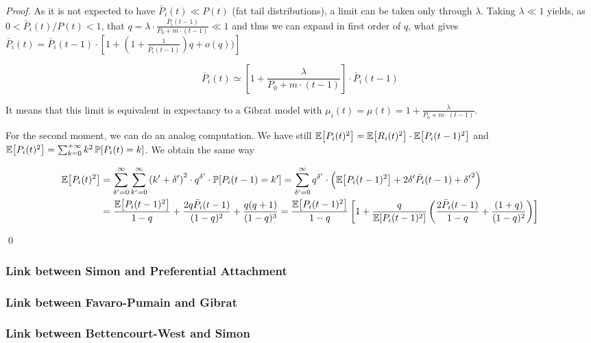 \begin{proof}
As it is not expected to have $\bar{P}_i(t)\ll P(t)$ (fat tail distributions), a limit can be taken only through $\lambda$. Taking $\lambda \ll 1$ yields, as $0 < \bar{P}_i(t)/P(t) < 1$, that $q=\lambda\cdot\frac{\bar{P}_i(t-1)}{P_0 + m\cdot (t-1)} \ll 1$ and thus we can expand in first order of $q$, what gives $\bar{P}_i(t)=\bar{P}_i(t-1)\cdot \left[1 + \left(1+\frac{1}{\bar{P}_i(t-1)}\right)q + o(q))\right]$

\[
\bar{P}_i(t) \simeq \left[1 + \frac{\lambda}{P_0 + m\cdot (t-1)}\right]\cdot \bar{P}_i(t-1)
\]

It means that this limit is equivalent in expectancy to a Gibrat model with $\mu_i(t) = \mu(t)=1 + \frac{\lambda}{P_0 + m\cdot (t-1)}$.

For the second moment, we can do an analog computation. We have still $\operatorname{\mathbb{E}}\!\left[P_i(t)^2\right] = \operatorname{\mathbb{E}}\!\left[R_i(t)^2\right]\cdot \operatorname{\mathbb{E}}\!\left[P_i(t-1)^2\right]$ and $\operatorname{\mathbb{E}}\!\left[P_i(t)^2\right]=\sum_{k=0}^{+\infty}{k^2 \operatorname{\mathbb{P}}\!\left[P_i(t)=k\right]}$. We obtain the same way 

\[
\begin{split}
\operatorname{\mathbb{E}}\!\left[P_i(t)^2\right] & = \sum_{\delta^{\prime}=0}^{\infty}{\sum_{k^{\prime}=0}^{\infty}{\left(k^\prime + \delta^{\prime}\right)^2\cdot q^{\delta^{\prime}} \cdot \operatorname{\mathbb{P}}\!\left[P_i(t-1)=k^\prime\right]}} = \sum_{\delta^{\prime}=0}^{\infty}{q^{\delta^{\prime}}\cdot \left(\operatorname{\mathbb{E}}\!\left[P_i(t-1)^2\right]+2\delta^{\prime}\bar{P}_i(t-1) + {\delta^{\prime}}^2\right)}\\
& = \frac{\operatorname{\mathbb{E}}\!\left[P_i(t-1)^2\right]}{1-q} + \frac{2 q \bar{P}_i(t-1)}{(1-q)^2} + \frac{q(q+1)}{(1-q)^3} = \frac{\operatorname{\mathbb{E}}\!\left[P_i(t-1)^2\right]}{1-q}\left[1 + \frac{q}{\operatorname{\mathbb{E}}\!\left[P_i(t-1)^2\right]}\left(\frac{2\bar{P}_i(t-1)}{1-q} + \frac{(1+q)}{(1-q)^2}\right)\right]
\end{split}
\]

\qed

\end{proof}




\subsubsection{Link between Simon and Preferential Attachment}
\label{subsubsec:gibrat-simon}


\subsubsection{Link between Favaro-Pumain and Gibrat}

\cite{favaro2011gibrat}

\subsubsection{Link between Bettencourt-West and Simon}

